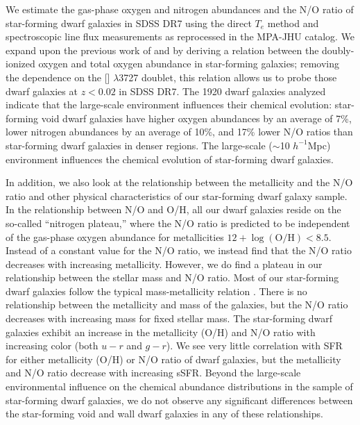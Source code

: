 We estimate the gas-phase oxygen and nitrogen abundances and the N/O ratio of 
star-forming dwarf galaxies in SDSS DR7 using the direct $T_e$ method and 
spectroscopic line flux measurements as reprocessed in the MPA-JHU catalog.  We 
expand upon the previous work of \cite{Douglass17a} and \cite{Douglass17b} by 
deriving a relation between the doubly-ionized oxygen and total oxygen abundance 
in star-forming galaxies; removing the dependence on the [] 
$\lambda$3727 doublet, this relation allows us to probe those dwarf galaxies at 
$z < 0.02$ in SDSS DR7.  The 1920 dwarf galaxies analyzed indicate that the 
large-scale environment influences their chemical evolution: star-forming void 
dwarf galaxies have higher oxygen abundances by an average of 7\%, lower 
nitrogen abundances by an average of 10\%, and 17\% lower N/O ratios than 
star-forming dwarf galaxies in denser regions.  The large-scale ($\sim$10 
$h^{-1}$Mpc) environment influences the chemical evolution of star-forming dwarf 
galaxies.

In addition, we also look at the relationship between the metallicity and the 
N/O ratio and other physical characteristics of our star-forming dwarf galaxy 
sample.  In the relationship between N/O and O/H, all our dwarf galaxies reside 
on the so-called ``nitrogen plateau,'' where the N/O ratio is predicted to be 
independent of the gas-phase oxygen abundance for metallicities 
$12 + \log (\text{O}/\text{H}) < 8.5$.  Instead of a constant value for the N/O 
ratio, we instead find that the N/O ratio decreases with increasing metallicity.  
However, we do find a plateau in our relationship between the stellar mass and 
N/O ratio.  Most of our star-forming dwarf galaxies follow the typical 
mass-metallicity relation \citep{Tremonti04}.  There is no relationship between 
the metallicity and  mass of the galaxies, but the N/O ratio decreases 
with increasing  mass for fixed stellar mass.  The star-forming dwarf 
galaxies exhibit an increase in the metallicity (O/H) and N/O ratio with 
increasing color (both $u-r$ and $g-r$).  We see very little correlation with 
SFR for either metallicity (O/H) or N/O ratio of dwarf galaxies, but the 
metallicity and N/O ratio decrease with increasing sSFR.  Beyond the large-scale 
environmental influence on the chemical abundance distributions in the sample of 
star-forming dwarf galaxies, we do not observe any significant differences 
between the star-forming void and wall dwarf galaxies in any of these 
relationships.

